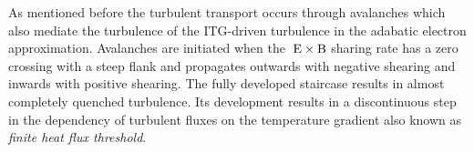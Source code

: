 As mentioned before the turbulent transport occurs through avalanches which also mediate the turbulence of the ITG-driven turbulence in the adabatic electron approximation. Avalanches are initiated when the $\mathrm{\:E}\times\mathrm{B}$ sharing rate has a zero crossing with a steep flank and propagates outwards with negative shearing and inwards with positive shearing. \cite{Idomura2009,McMillan2009} The fully developed staircase results in almost completely quenched turbulence. Its development results in a discontinuous step in the dependency of turbulent fluxes on the temperature gradient also known as \textit{finite heat flux threshold}. \cite{Peeters2016,Weikl2017}